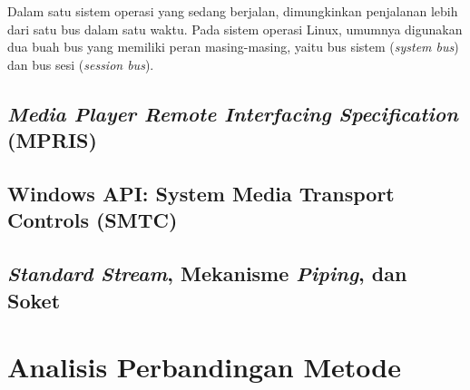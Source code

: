 Dalam satu sistem operasi yang sedang berjalan, dimungkinkan penjalanan lebih dari satu bus dalam satu waktu. Pada sistem operasi Linux, umumnya digunakan dua buah bus yang memiliki peran masing-masing, yaitu bus sistem (\textit{system bus}) dan bus sesi (\textit{session bus}).

\subsection{\textit{Media Player Remote Interfacing Specification} (MPRIS)}

\subsection{Windows API: System Media Transport Controls (SMTC)}

\subsection{\textit{Standard Stream}, Mekanisme \textit{Piping}, dan Soket}

\section{Analisis Perbandingan Metode}

